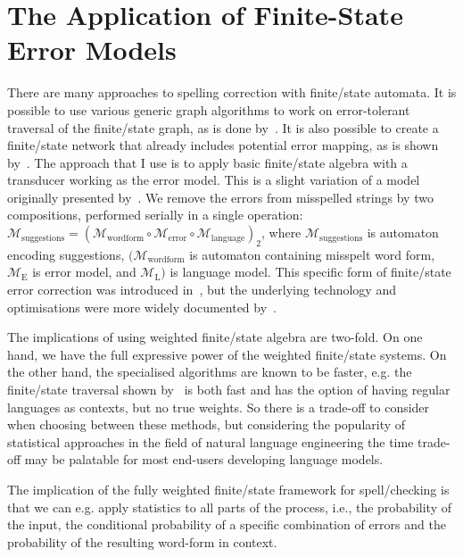 \documentclass[officiallayout,final]{unihelcompling}
\begin{document}
\section{The Application of Finite-State Error Models}
\label{sec:error-application}

There are many approaches to spelling correction with finite\-/state automata.
It is possible to use various generic graph algorithms to work on
error-tolerant traversal of the finite\-/state graph, as is done
by~\citet{hulden2009fast}.  It is also possible to create a finite\-/state
network that already includes potential error mapping, as is shown
by~\citet{schulz2002fast}. The approach that I use is to apply basic
finite\-/state algebra with a transducer working as the error model. This is a
slight variation of a model originally presented by~\citet{mohri2003edit}. We
remove the errors from misspelled strings by two compositions, performed
serially in a single operation: $\mathcal{M}_{\mathrm{suggestions}} =
(\mathcal{M}_{\mathrm{word form}} \circ \mathcal{M}_{\mathrm{error}} \circ
\mathcal{M}_{\mathrm{language}})_2$, where $\mathcal{M}_{\mathrm{suggestions}}$
is automaton encoding suggestions, $(\mathcal{M}_{\mathrm{word form}}$ is
automaton containing misspelt word form, $\mathcal{M}_{\mathrm{E}}$ is error
model, and $\mathcal{M}_{\mathrm{L}})$ is language model. This specific form of
finite\-/state error correction was introduced
in~, but the underlying technology and
optimisations were more widely documented by~\citet{linden2011hfst}.

The implications of using weighted finite\-/state algebra are two-fold. On one
hand, we have the full expressive power of the weighted finite\-/state systems.
On the other hand, the specialised algorithms are known to be faster, e.g.  the
finite\-/state traversal shown by~\citet{hulden2009fast} is both fast and has
the option of having regular languages as contexts, but no true weights.  So
there is a trade-off to consider when choosing between these methods, but
considering the popularity of statistical approaches in the field of natural
language engineering the time trade-off may be palatable for most end-users
developing language models.

The implication of the fully weighted finite\-/state framework for
spell\-/checking is that we can e.g. apply statistics to all parts of the
process, i.e., the probability of the input, the conditional probability of a
specific combination of errors and the probability of the resulting word-form
in context. 
\end{document}
